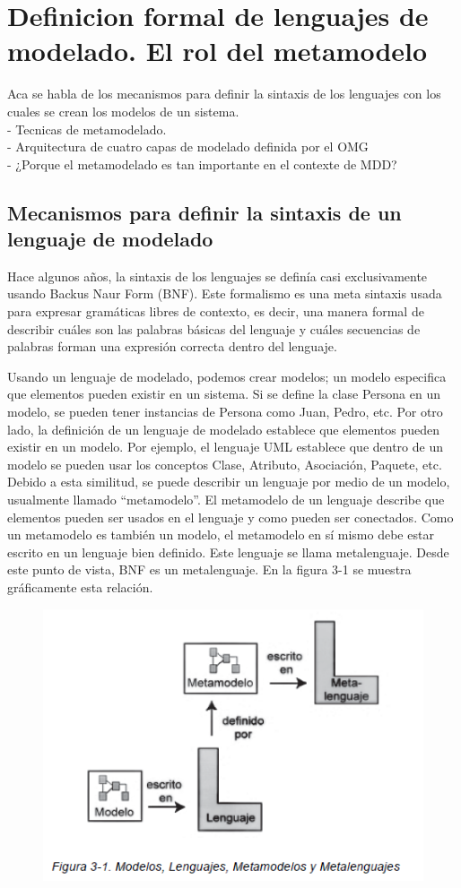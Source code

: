 \section{Definicion formal de lenguajes de modelado.
El rol del metamodelo}
Aca se habla de los mecanismos para definir la sintaxis de los lenguajes con los cuales se crean los modelos de un sistema.
\\
- Tecnicas de metamodelado.
\\
- Arquitectura de cuatro capas de modelado definida por el OMG
\\
- ¿Porque el metamodelado es tan importante en el contexte de MDD?
\\
\subsection{Mecanismos para definir la sintaxis de un lenguaje de modelado}
Hace algunos años, la sintaxis de los lenguajes se definía casi exclusivamente
usando Backus Naur Form (BNF). Este formalismo es una meta
sintaxis usada para expresar gramáticas libres de contexto, es decir,
una manera formal de describir cuáles son las palabras básicas del lenguaje
y cuáles secuencias de palabras forman una expresión correcta
dentro del lenguaje.

Usando un lenguaje de modelado,
podemos crear modelos; un modelo especifica que elementos
pueden existir en un sistema. Si se define la clase Persona en un modelo,
se pueden tener instancias de Persona como Juan, Pedro, etc. Por otro
lado, la definición de un lenguaje de modelado establece que elementos
pueden existir en un modelo. Por ejemplo, el lenguaje UML establece que
dentro de un modelo se pueden usar los conceptos Clase, Atributo, Asociación,
Paquete, etc. Debido a esta similitud, se puede describir un lenguaje
por medio de un modelo, usualmente llamado “metamodelo”. El
metamodelo de un lenguaje describe que elementos pueden ser usados
en el lenguaje y como pueden ser conectados.
Como un metamodelo es también un modelo, el metamodelo en sí mismo
debe estar escrito en un lenguaje bien definido. Este lenguaje se
llama metalenguaje. Desde este punto de vista, BNF es un metalenguaje.
En la figura 3-1 se muestra gráficamente esta relación.

\begin{figure}[H]
\centering
\includegraphics[scale=0.9]{./Imagenes/modelo8}
\end{figure}

